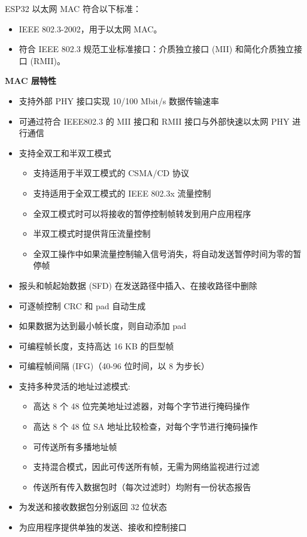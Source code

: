 \documentclass[main\_\_CN.tex]{subfiles}
\begin{document}
ESP32 以太网 MAC 符合以下标准：
\begin{itemize}
		\item IEEE 802.3-2002，用于以太网 MAC。
	\item 符合 IEEE 802.3 规范工业标准接口：介质独立接口 (MII) 和简化介质独立接口 (RMII)。
\end{itemize}
{\bfseries MAC 层特性}
\begin{itemize}
	\item 支持外部 PHY 接口实现 10/100 Mbit/s 数据传输速率
	\item 可通过符合 IEEE802.3 的 MII 接口和 RMII 接口与外部快速以太网 PHY 进行通信
	\item 支持全双工和半双工模式 \begin{itemize}
    	\item 支持适用于半双工模式的 CSMA/CD 协议
		\item 支持适用于全双工模式的 IEEE 802.3x 流量控制
		\item 全双工模式时可以将接收的暂停控制帧转发到用户应用程序
		\item 半双工模式时提供背压流量控制
		\item 全双工操作中如果流量控制输入信号消失，将自动发送暂停时间为零的暂停帧
		\end{itemize}
	\item 报头和帧起始数据 (SFD) 在发送路径中插入、在接收路径中删除
	\item 可逐帧控制 CRC 和 pad 自动生成
	\item 如果数据为达到最小帧长度，则自动添加 pad
	\item 可编程帧长度，支持高达 16 KB 的巨型帧
	\item 可编程帧间隔 (IFG)（40-96 位时间，以 8 为步长）
	\item 支持多种灵活的地址过滤模式:
		 \begin{itemize}
    	\item 高达 8 个 48 位完美地址过滤器，对每个字节进行掩码操作
		\item 高达 8 个 48 位 SA 地址比较检查，对每个字节进行掩码操作
		\item 可传送所有多播地址帧
		\item 支持混合模式，因此可传送所有帧，无需为网络监视进行过滤
		\item 传送所有传入数据包时（每次过滤时）均附有一份状态报告    \end{itemize}
	\item 为发送和接收数据包分别返回 32 位状态
	\item 为应用程序提供单独的发送、接收和控制接口

\end{itemize}
\end{document}
